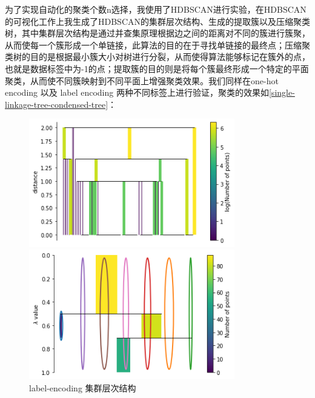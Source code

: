 为了实现自动化的聚类个数n选择，我使用了HDBSCAN进行实验，在HDBSCAN的可视化工作上我生成了HDBSCAN的集群层次结构、生成的提取簇以及压缩聚类树，其中集群层次结构是通过并查集原理根据边之间的距离对不同的簇进行簇聚，从而使每一个簇形成一个单链接，此算法的目的在于寻找单链接的最终点；压缩聚类树的目的是根据最小簇大小对树进行分裂，从而使得算法能够标记在簇外的点，也就是数据标签中为-1的点；提取簇的目的则是将每个簇最终形成一个特定的平面聚类，从而使不同簇映射到不同平面上增强聚类效果。我们同样在one-hot encoding 以及 label encoding 两种不同标签上进行验证，聚类的效果如\ref{single-linkage-tree-condensed-tree}：
\begin{figure}[htb]
    \vspace{13pt} %
    \centering
    \begin{minipage}[htb]{0.4\linewidth}
        \includegraphics[width=0.8\textwidth]{images/HDBSCAN-single-linkage-tree-label-encoding.png}
        \caption{label-encoding 集群层次结构}
    \end{minipage}
    \begin{minipage}[htb]{0.4\linewidth}
        \includegraphics[width=0.8\textwidth]{images/HDBSCAN-condensed-tree-label-encoding.png}

\end{minipage}
\end{figure}
